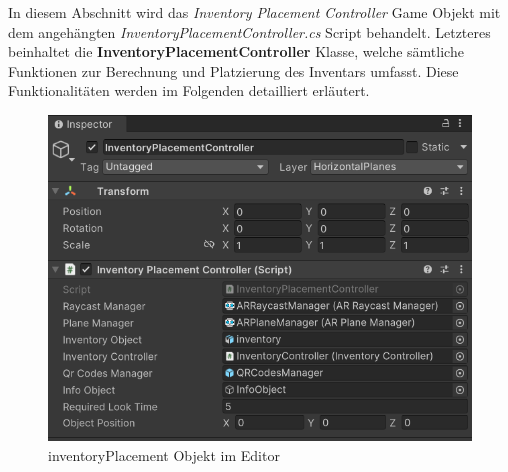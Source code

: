 In diesem Abschnitt wird das \textit{Inventory Placement Controller} Game Objekt mit dem angehängten \textit{InventoryPlacementController.cs}
Script behandelt. Letzteres beinhaltet die \textbf{InventoryPlacementController} Klasse, welche sämtliche Funktionen zur
Berechnung und Platzierung des Inventars umfasst. Diese Funktionalitäten werden im Folgenden detailliert erläutert.

\begin{figure}[h]
\centering
\includegraphics[scale=0.8]{images/invPlace_Editor}
\caption{inventoryPlacement Objekt im Editor}
\label{fig:inventoryPlacementController_Editor}
\end{figure}

